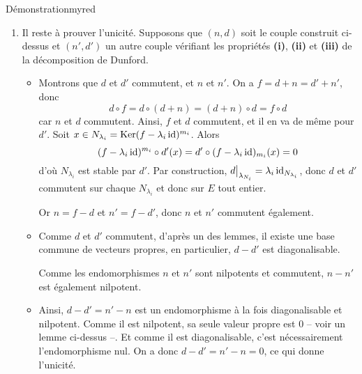 \begin{demo}{Démonstration}{myred}
\begin{itemize}[label=\textcolor{myred}{$\to$}]
\begin{enumerate}
                \[ d \circ n(x) = d \circ n(x_1 + \cdots + x_r) = d \circ n(x_1) + \cdots + d \circ n(x_r) = n \circ d(x_1) + \cdots + n \circ d(x_r) = n \circ d(x) \]
                Ainsi, $d$ et $n$ commutent.
                \item Il reste à prouver l’unicité. Supposons que $(n,d)$ soit le couple construit ci-dessus et $(n', d')$ un autre couple vérifiant les propriétés \textbf{(i)}, \textbf{(ii)} et \textbf{(iii)} de la décomposition de Dunford.
                \begin{itemize}
                    \item Montrons que $d$ et $d'$ commutent, et $n$ et $n'$. On a $f = d + n = d' + n'$, donc 
                    \[ d \circ f = d \circ (d + n) = (d + n) \circ d = f \circ d \]    
                    car $n$ et $d$ commutent. Ainsi, $f$ et $d$ commutent, et il en va de même pour $d'$. Soit $x \in N_{\lambda_i} = \operatorname{Ker}(f - \lambda_i \operatorname{id})^{m_i}$. Alors 
                    \[ (f - \lambda_i \operatorname{id})^{m_i} \circ d'(x) = d' \circ (f - \lambda_i \operatorname{id})_{m_i}(x) = 0 \]   
                    d’où $N_{\lambda_i}$ est stable par $d'$. Par construction, $\restr{d}{\lambda_{N_i}} = \lambda_i \id_{N_{\lambda_i}}$, donc $d$ et $d'$ commutent sur chaque $N_{\lambda_i}$ et donc sur $E$ tout entier.
                    
                    Or $n = f - d$ et $n' = f - d'$, donc $n$ et $n'$ commutent également.
                    \item Comme $d$ et $d'$ commutent, d’après un des lemmes, il existe une base commune de vecteurs propres, en particulier, $d - d'$ est diagonalisable. 
                    
                    Comme les endomorphismes $n$ et $n'$ sont nilpotents et commutent, $n - n'$ est également nilpotent. 
                    \item Ainsi, $d - d' = n' - n$ est un endomorphisme à la fois diagonalisable et nilpotent. Comme il est nilpotent, sa seule valeur propre est $0$ -- voir un lemme ci-dessus --. Et comme il est diagonalisable, c’est nécessairement l’endomorphisme nul. On a donc $d - d' = n' - n = 0$, ce qui donne l’unicité.
                \end{itemize}
            \end{enumerate}
        \end{itemize}
    \end{demo}

